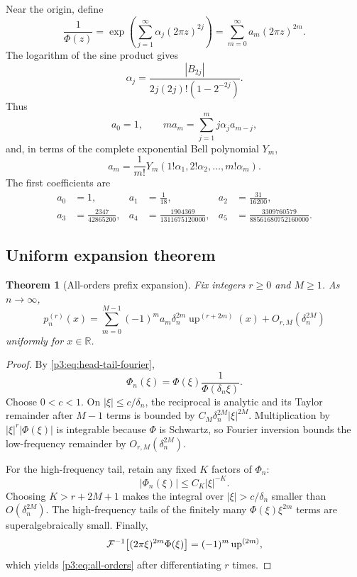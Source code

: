 \documentclass[11pt,oneside]{article}
\numberwithin{equation}{section}
\newtheorem{theorem}{Theorem}[section]
\theoremstyle{definition}
\theoremstyle{remark}
\newcommand{\R}{\mathbb R}
\newcommand{\Up}{\operatorname{up}}
\begin{document}
Near the origin, define
\begin{equation}
 \frac1{\Phi(z)}
 =\exp\!\left(\sum_{j=1}^{\infty}\alpha_j(2\pi z)^{2j}\right)
 =\sum_{m=0}^{\infty}a_m(2\pi z)^{2m}.
 \label{p3:eq:reciprocal-series}
\end{equation}
The logarithm of the sine product gives
\begin{equation}
 \alpha_j=\frac{|B_{2j}|}{2j(2j)!(1-2^{-2j})}.
 \label{p3:eq:alpha-Bernoulli}
\end{equation}
Thus
\begin{equation}
 a_0=1,
 \qquad
 ma_m=\sum_{j=1}^{m}j\alpha_j a_{m-j},
 \label{p3:eq:a-recurrence}
\end{equation}
and, in terms of the complete exponential Bell polynomial $Y_m$,
\begin{equation}
 a_m=\frac1{m!}Y_m(1!\alpha_1,2!\alpha_2,\ldots,m!\alpha_m).
 \label{p3:eq:a-Bell}
\end{equation}
The first coefficients are
\begin{equation}
\begin{aligned}
 a_0&=1,&
 a_1&=\frac1{18},&
 a_2&=\frac{31}{16200},\\
 a_3&=\frac{2347}{42865200},&
 a_4&=\frac{1904369}{1311675120000},&
 a_5&=\frac{3309760579}{88561680752160000}.
\end{aligned}
 \label{p3:eq:first-a}
\end{equation}

\subsection{Uniform expansion theorem}

\begin{theorem}[All-orders prefix expansion]
\label{p3:thm:all-orders}
Fix integers $r\ge0$ and $M\ge1$.  As $n\to\infty$,
\begin{equation}
 \boxed{
 p_n^{(r)}(x)=
 \sum_{m=0}^{M-1}(-1)^m a_m\delta_n^{2m}\Up^{(r+2m)}(x)
 +O_{r,M}(\delta_n^{2M})}
 \label{p3:eq:all-orders}
\end{equation}
uniformly for $x\in\R$.
\end{theorem}

\begin{proof}
By \cref{p3:eq:head-tail-fourier},
\[
 \Phi_n(\xi)=\Phi(\xi)\frac1{\Phi(\delta_n\xi)}.
\]
Choose $0<c<1$.  On $|\xi|\le c/\delta_n$, the reciprocal is analytic and its Taylor
remainder after $M-1$ terms is bounded by
$C_M\delta_n^{2M}|\xi|^{2M}$.  Multiplication by
$|\xi|^r|\Phi(\xi)|$ is integrable because $\Phi$ is Schwartz, so Fourier inversion
bounds the low-frequency remainder by $O_{r,M}(\delta_n^{2M})$.

For the high-frequency tail, retain any fixed $K$ factors of $\Phi_n$:
\[
 |\Phi_n(\xi)|\le C_K|\xi|^{-K}.
\]
Choosing $K>r+2M+1$ makes the integral over $|\xi|>c/\delta_n$ smaller than
$O(\delta_n^{2M})$.  The high-frequency tails of the finitely many $\Phi(\xi)\xi^{2m}$
terms are superalgebraically small.  Finally,
\[
 \Fourier^{-1}\bigl[(2\pi\xi)^{2m}\Phi(\xi)\bigr]
 =(-1)^m\Up^{(2m)},
\]
which yields \cref{p3:eq:all-orders} after differentiating $r$ times.
\end{proof}
\end{document}
